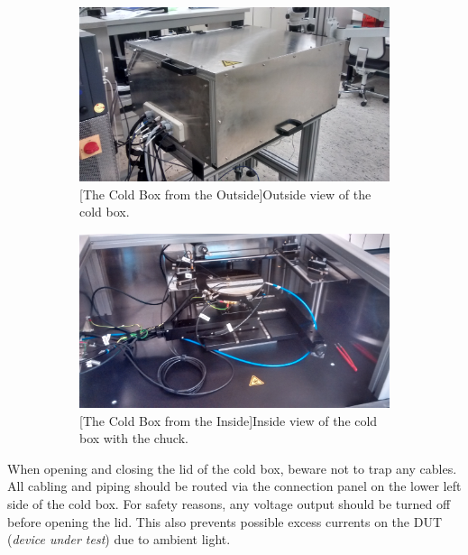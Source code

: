 \documentclass[a4paper]{article}
\begin{document}
\begin{figure}[hbtp]
\centering
\begin{subfigure}[t]{0.475\textwidth}
\centering\captionsetup{width=.8\linewidth}%
\includegraphics[width=\linewidth]{pictures/box.jpg}
[The Cold Box from the Outside]{Outside view of the cold box.}
\label{fig:outsidecoldbox}
\end{subfigure}
\begin{subfigure}[t]{0.475\textwidth}
\centering\captionsetup{width=.8\linewidth}%
\includegraphics[width=\linewidth]{pictures/inside_box.jpg}
[The Cold Box from the Inside]{Inside view of the cold box with the chuck.}
\label{fig:insidecoldbox}
\end{subfigure}
\end{figure}

When opening and closing the lid of the cold box, beware not to trap any cables.
All cabling and piping should be routed via the connection panel on the lower left side of the cold box.
For safety reasons, any voltage output should be turned off before opening the lid.
This also prevents possible excess currents on the DUT ({\it device under test}) due to ambient light.
\end{document}

